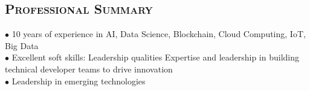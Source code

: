 \begin{resume}


\section{\textsc{Professional Summary}}
$\bullet$ 10 years of experience in AI, Data Science, Blockchain, Cloud Computing, IoT, Big Data\\
$\bullet$ Excellent soft skills: Leadership qualities Expertise and leadership in building technical developer teams to drive innovation \\
$\bullet$ Leadership in emerging technologies



\end{resume}
